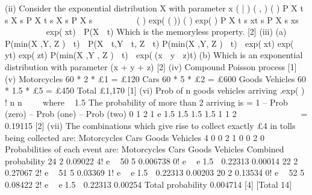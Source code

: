 \documentclass[a4paper,12pt]{article}
\begin{document}
(ii) Consider the exponential distribution X with parameter x
( | ) ( , )
( )
P X t s X s P X t s X s
P X s
  
   

( ) exp( ( ))
( ) exp( )
P X t s xt s
P X s xs
   
 
 
 exp(xt)  P(X  t)
Which is the memoryless property. [2]
(iii) (a) P(min(X ,Y, Z )  t)  P(X  t,Y  t, Z  t)
P(min(X ,Y, Z )  t)  exp(xt) exp( yt) exp(zt)
P(min(X ,Y , Z )  t)  exp((x  y  z)t)
(b) Which is an exponential distribution with parameter (x + y + z) [2]
(iv) Compound Poisson process [1]
(v) Motorcycles 60 * 2 * £1 = £120
Cars 60 * 5 * £2 = £600
Goods Vehicles 60 * 1.5 * £5 = £450
Total £1,170 [1]
(vi) Prob of n goods vehicles arriving
.exp( )
!
  n
n
 
 where  1.5
The probability of more than 2 arriving is
= 1 – Prob (zero) – Prob (one) – Prob (two)
0 1 2
1 e 1.5 1.5 1.5 1.5
1 1 2
  
     
 
= 0.19115 [2]
(vii) The combinations which give rise to collect exactly £4 in tolls being collected
are:
  Motorcycles
Cars Goods Vehicles
4 0 0
2 1 0
0 2 0
Probabilities of each event are:
  Motorcycles Cars Goods Vehicles Combined
probability
24 2 0.09022
4!
  e

50 5 0.006738
0!
  e
 e1.5  0.22313 0.00014
22 2 0.27067
2!
  e

51 5 0.03369
1!
  e
 e1.5  0.22313 0.00203
20 2 0.13534
0!
  e

52 5 0.08422
2!
  e
 e1.5  0.22313 0.00254
Total probability 0.004714 [4]
[Total 14]

\end{document}
